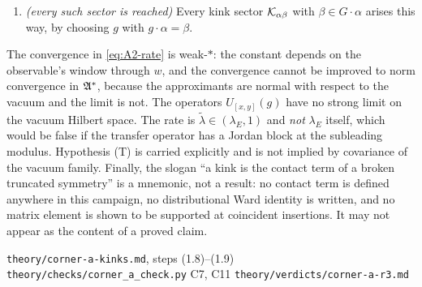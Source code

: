 \begin{theorem}
\begin{enumerate}
  modulo the global diagonal symmetry is the \emph{double coset}
  \begin{equation}
    \mathfrak{d}(\alpha_L,\alpha_R)\;=\;H_\alpha\,g_L^{-1}g_R\,H_\alpha
    \;\in\;H_\alpha\backslash G/H_\alpha ,
    \label{eq:double-coset}
  \end{equation}
  which for $G=SU(2)$, $H_\alpha=\Ug(1)$ is the relative angle
  $\cos\vartheta=\hat n_L\cdot\hat n_R$.
\item[(f)] \emph{(every such sector is reached)} Every kink sector
  $\mathcal{K}_{\alpha\beta}$ with $\beta\in G\cdot\alpha$ arises this way, by choosing
  $g$ with $g\cdot\alpha=\beta$.
\end{enumerate}
\end{theorem}

\begin{scope}
The convergence in \cref{eq:A2-rate} is weak-$*$: the constant depends on the
observable's window through $w$, and the convergence cannot be improved to norm
convergence in $\mathfrak{A}^*$, because the approximants are normal with respect to the
vacuum and the limit is not.  The operators $U_{[x,y]}(g)$ have no strong limit
on the vacuum Hilbert space.  The rate is $\tilde\lambda\in(\lambda_E,1)$ and
\emph{not} $\lambda_E$ itself, which would be false if the transfer operator has
a Jordan block at the subleading modulus.  Hypothesis (T) is carried explicitly
and is not implied by covariance of the vacuum family.  Finally, the slogan ``a
kink is the contact term of a broken truncated symmetry'' is a mnemonic, not a
result: no contact term is defined anywhere in this campaign, no distributional
Ward identity is written, and no matrix element is shown to be supported at
coincident insertions.  It may not appear as the content of a proved claim.
\end{scope}

%
{\texttt{theory/corner-a-kinks.md}, steps (1.8)--(1.9)}%
{\texttt{theory/checks/corner\_a\_check.py} C7, C11}%
{\texttt{theory/verdicts/corner-a-r3.md}}


